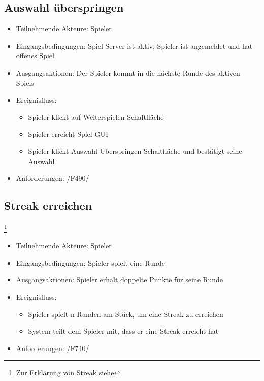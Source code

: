 \documentclass[a4paper]{scrreprt}
\begin{document}
	\subsection{Auswahl überspringen}
	\begin{itemize}
		\item Teilnehmende Akteure: \Gls{Spieler}
		\item Eingangsbedingungen: \Gls{Spiel-Server} ist aktiv, \Gls{Spieler} ist angemeldet und hat offenes Spiel
        \item Ausgangsaktionen: Der \Gls{Spieler} kommt in die nächste Runde des aktiven Spiels
		\item Ereignisfluss:
		\begin{itemize}
			\item \Gls{Spieler} klickt auf Weiterspielen-Schaltfläche
			\item \Gls{Spieler} erreicht Spiel-GUI
			\item \Gls{Spieler} klickt Auswahl-Überspringen-Schaltfläche und bestätigt seine Auswahl
		\end{itemize}
        \item Anforderungen: /F490/
	\end{itemize}
     
    \subsection{Streak erreichen}\footnote{Zur Erklärung von Streak siehe }
    \begin{itemize}
        \item Teilnehmende Akteure: \Gls{Spieler}
        \item Eingangsbedingungen: \Gls{Spieler} spielt eine Runde
        \item Ausgangsaktionen: \Gls{Spieler} erhält doppelte Punkte für seine Runde
        \item Ereignisfluss:
        \begin{itemize}
            \item \Gls{Spieler} spielt n Runden am Stück, um eine Streak zu erreichen
            \item System teilt dem \Gls{Spieler} mit, dass er eine Streak erreicht hat
        \end{itemize}
        \item Anforderungen: /F740/
    \end{itemize}
    
\end{document}
